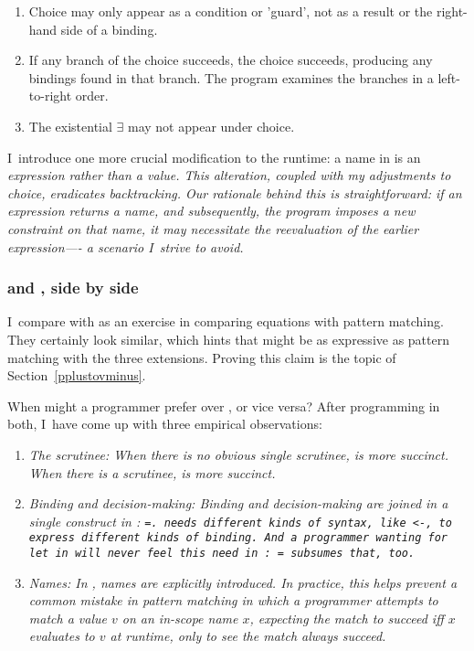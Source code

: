 \documentclass[manuscript,screen,review, 12pt, nonacm]{acmart}
\begin{document}
\begin{enumerate}
\item Choice may only appear as a condition or 'guard', not as a result
or the right-hand side of a binding.
\item If any branch of the choice succeeds, the choice succeeds,
producing any bindings found in that branch. The program examines the
branches in a left-to-right order.
\item The existential $\exists$ may not appear under choice.
\end{enumerate}

I~introduce one more crucial modification to the \VC runtime: a name in
\VMinus is an \it{expression} rather than a \it{value}. This alteration,
coupled with my adjustments to choice, eradicates backtracking. Our
rationale behind this is straightforward: if an expression returns a
name, and subsequently, the program imposes a new constraint on that
name, it may necessitate the reevaluation of the earlier expression—- a
scenario I~strive to avoid. 

\subsubsection{\VMinus and \PPlus, side by side}
I~compare \VMinus with \PPlus as an exercise in comparing equations with
pattern matching. They certainly look similar, which hints that \VMinus
might be as expressive as pattern matching with the three extensions. 
Proving this claim is the topic of Section~\ref{pplustovminus}. 

When might a programmer prefer \VMinus over \PPlus, or vice versa? After
programming in both, I~have come up with three empirical observations: 

\begin{enumerate}
  \item \it{The scrutinee:} When there is no obvious single scrutinee, \VMinus is more succinct.
  When there is a scrutinee, \PPlus is more succinct. 
  \item \it{Binding and decision-making:} Binding and decision-making are
  joined in a single construct in \VMinus: \tt{=}. \PPlus needs different
  kinds of syntax, like \tt{<-}, to express different kinds of binding. And
  a programmer wanting for \tt{let} in \PPlus will never feel this need in
  \VMinus: \tt{=} subsumes that, too. 
  \item \it{Names:} In \VMinus, names are explicitly introduced. In
  practice, this helps prevent a common mistake in pattern matching in which
  a programmer attempts to match a value $v$ on an in-scope name $x$,
  expecting the match to succeed iff $x$ evaluates to $v$ at runtime, only
  to see the match always succeed. 
\end{enumerate}     
\end{document}
